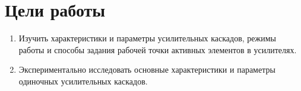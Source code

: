 \section{Цели работы}


\begin{enumerate}

\item
Изучить характеристики и параметры усилительных каскадов, режимы работы и способы задания рабочей точки активных элементов в усилителях. 

\item
Экспериментально исследовать основные характеристики и параметры одиночных усилительных каскадов.

\end{enumerate}
